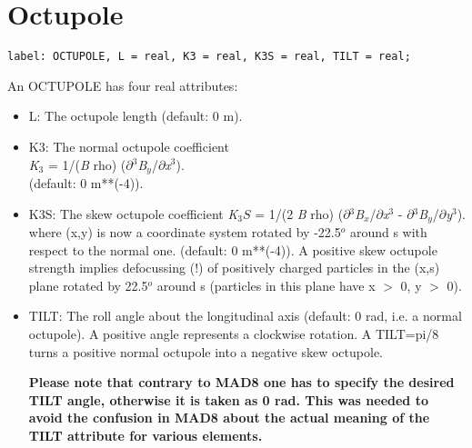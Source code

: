 
\section{Octupole}

\begin{verbatim}
label: OCTUPOLE, L = real, K3 = real, K3S = real, TILT = real;
\end{verbatim} 

An OCTUPOLE has four real attributes: 
\begin{itemize}
   \item L: The octupole length (default: 0 m). 

   \item K3: The normal octupole coefficient \\
     \textit{K}$_3$ = 1/(\textit{B} rho)
     ($\partial$$^3$\textit{B$_y$}/$\partial$\textit{x}$^3$). \\ 
     (default: 0 m**(-4)). 

   \item K3S: The skew octupole coefficient 
     \textit{K}$_3S$ = 1/(2 \textit{B} rho)
     ($\partial$$^3$\textit{B$_x$}/$\partial$\textit{x}$^3$ -
     $\partial$$^3$\textit{B$_y$}/$\partial$\textit{y}$^3$). \\
     where (x,y) is now a coordinate system rotated by -22.5$^o$ around
     s with respect to the normal one. (default: 0 m**(-4)). A positive
     skew octupole strength implies defocussing (!) of positively
     charged particles in the (x,s) plane rotated by 22.5$^o$ around s
     (particles in this plane have x $>$ 0, y $>$ 0).  

   \item TILT: The roll angle about the longitudinal axis (default: 0
     rad, i.e. a normal octupole). A positive angle represents a
     clockwise rotation. A TILT=pi/8 turns a positive normal octupole
     into a negative skew octupole.  

     \textbf{  Please note that contrary to MAD8 one has to specify the
       desired TILT angle, otherwise it is taken as 0 rad. This was
       needed to avoid the confusion in MAD8 about the actual meaning of
       the TILT attribute for various elements. }

\end{itemize}

